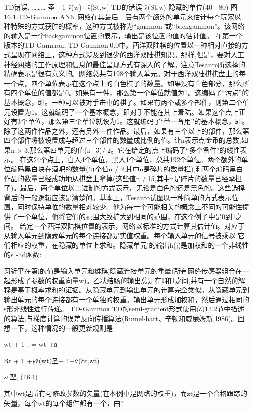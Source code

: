 TD错误,
………
圣+ 1 v̂(w)−v̂(St,w)
TD的错误
v̂(St,w)
隐藏的单位(40 - 80)
图16.1:TD-Gammon ANN
网络在其最后一层有两个额外的单元来估计每个玩家以一种特殊的方式获胜的概率，这种方式被称为“gammon”或“backgammon”。该网络的输入是一个backgammon位置的表示，输出是该位置的值的估计值。
在第一个版本的TD-Gammon, TD-Gammon 0.0中，西洋双陆棋的位置以一种相对直接的方式呈现在网络上，这种方式涉及到很少的西洋双陆棋知识。那样,但是，要对人工神经网络的工作原理和信息的最佳呈现方式有深入的了解。注意Tesauro所选择的精确表示是很有意义的。网络总共有198个输入单元。对于西洋双陆棋棋盘上的每一个点，四个单位表示在这个点上的白色棋子的数量。如果没有白色部分，那么所有四个单位的值都是0。如果有一件，那么第一个单位就值为1。这编码了“污点”的基本概念，即。一种可以被对手击中的棋子。如果有两个或多个部件，则第二个单元设置为1。这就编码了一个基本概念，即对手不能在其上着陆。如果这个点上正好有3个单位，那么第三个单位就设为1。这就编码了“单一备用”的基本概念，即。除了这两件作品之外，还有另外一件作品。最后，如果有三个以上的部件，那么第四个部件将被设置成与超过三个部件的数量成比例的值。让n表示点金币的总数,如果n > 3,那么第四单元的值(n−3)/ 2。它在给定的点上编码了“多个备件”的线性表示。
在这24个点上，白人4个单位，黑人4个单位，总共192个单位。两个额外的单位编码黑白块在酒吧的数量(每个值n / 2,其中n是碎片的数量栏),和两个编码黑白作品的数量已经成功地从棋盘上拿掉(这些值n / 15,其中n是碎片的数量已经承担了)。最后，两个单位以二进制的方式表示，无论是白色的还是黑色的。这些选择背后的一般逻辑应该是清楚的。基本上，Tesauro试图以一种简单的方式表示位置，同时保持单位的数量相对较少。他为每一个可能相关的概念上不同的可能性提供了一个单位，他将它们的范围大致扩大到相同的范围，在这个例子中是0到1之间。
给定一个西洋双陆棋位置的表示，网络以标准的方式计算其估计值。对应于从输入单元到隐藏单元的每个连接都是实值权重。每个输入单元的信号被乘以
它们相应的权重，在隐藏的单位上求和。隐藏单元j的输出h(j)是加权和的一个非线性的s - id函数:
 
习近平在第i的值是输入单元和维琪j隐藏连接单元的重量(所有网络传感器组合在一起形成了参数的权重向量w)。乙状结肠的输出总是在0和1之间,并有一个自然的解释是基于概率求和的证据。从隐藏单元到输出单元的计算完全类似。从隐藏单元到输出单元的每个连接都有一个单独的权重。输出单元形成加权和，然后通过相同的s形非线性进行传递。
TD-Gammon TD的semi-gradient形式使用(λ)12.2节中描述的算法,与梯度计算的误差反向传播算法(Rumel-hart、辛顿和威廉姆斯,1986)。回想一下，这种情况的一般更新规则是

wt + 1
.
= wt +α

Rt + 1 +γv̂(wt)圣+ 1−v̂(St,wt)

zt型, 					(16.1)

其中wt是所有可修改参数的矢量(在本例中是网络的权重)，而zt是一个合格跟踪的矢量，每个wt的每个组件都有一个，由?

